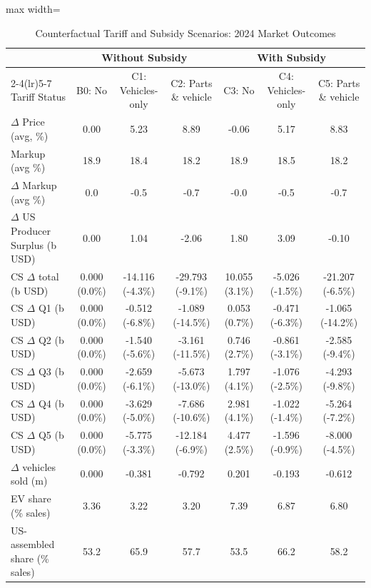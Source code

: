 \begin{table}[!htbp]
\centering
\caption{Counterfactual Tariff and Subsidy Scenarios: 2024 Market Outcomes}
\label{tab:cf_summary_full}
\scriptsize
\setlength{\tabcolsep}{3pt}
\renewcommand{\arraystretch}{1.10}
\begin{adjustbox}{max width=\textwidth}
\begin{threeparttable}
\begin{tabular}{lcccccc}
\toprule
 & \multicolumn{3}{c}{Without Subsidy} & \multicolumn{3}{c}{With Subsidy} \\
\cmidrule(lr){2-4}\cmidrule(lr){5-7}
Tariff Status & B0: No & C1: Vehicles-only & C2: Parts \& vehicle & C3: No & C4: Vehicles-only & C5: Parts \& vehicle \\
\midrule
$\Delta$ Price (avg, \%) & 0.00 & 5.23 & 8.89 & -0.06 & 5.17 & 8.83 \\
Markup (avg \%) & 18.9 & 18.4 & 18.2 & 18.9 & 18.5 & 18.2 \\
$\Delta$ Markup (avg \%) & 0.0 & -0.5 & -0.7 & -0.0 & -0.5 & -0.7 \\
$\Delta$ US Producer Surplus (b USD) & 0.00 & 1.04 & -2.06 & 1.80 & 3.09 & -0.10 \\
CS $\Delta$ total (b USD) & 0.000 (0.0\%) & -14.116 (-4.3\%) & -29.793 (-9.1\%) & 10.055 (3.1\%) & -5.026 (-1.5\%) & -21.207 (-6.5\%) \\
CS $\Delta$ Q1 (b USD) & 0.000 (0.0\%) & -0.512 (-6.8\%) & -1.089 (-14.5\%) & 0.053 (0.7\%) & -0.471 (-6.3\%) & -1.065 (-14.2\%) \\
CS $\Delta$ Q2 (b USD) & 0.000 (0.0\%) & -1.540 (-5.6\%) & -3.161 (-11.5\%) & 0.746 (2.7\%) & -0.861 (-3.1\%) & -2.585 (-9.4\%) \\
CS $\Delta$ Q3 (b USD) & 0.000 (0.0\%) & -2.659 (-6.1\%) & -5.673 (-13.0\%) & 1.797 (4.1\%) & -1.076 (-2.5\%) & -4.293 (-9.8\%) \\
CS $\Delta$ Q4 (b USD) & 0.000 (0.0\%) & -3.629 (-5.0\%) & -7.686 (-10.6\%) & 2.981 (4.1\%) & -1.022 (-1.4\%) & -5.264 (-7.2\%) \\
CS $\Delta$ Q5 (b USD) & 0.000 (0.0\%) & -5.775 (-3.3\%) & -12.184 (-6.9\%) & 4.477 (2.5\%) & -1.596 (-0.9\%) & -8.000 (-4.5\%) \\
$\Delta$ vehicles sold (m) & 0.000 & -0.381 & -0.792 & 0.201 & -0.193 & -0.612 \\
EV share (\% sales) & 3.36 & 3.22 & 3.20 & 7.39 & 6.87 & 6.80 \\
US-assembled share (\% sales) & 53.2 & 65.9 & 57.7 & 53.5 & 66.2 & 58.2 \\

\end{tabular}
\end{threeparttable}
\end{adjustbox}
\end{table}
